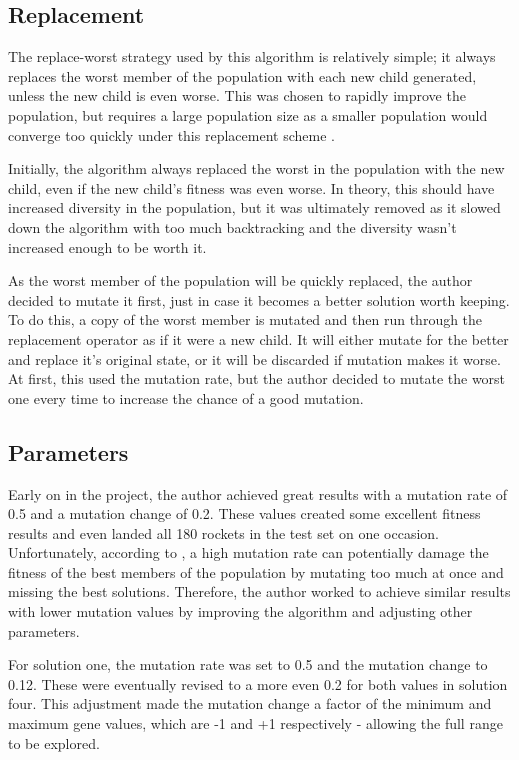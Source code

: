 \documentclass[sigconf]{acmart}
\begin{document}
\subsection{Replacement}
The replace-worst strategy used by this algorithm is relatively simple; it always replaces the worst member of the population with each new child generated, unless the new child is even worse. This was chosen to rapidly improve the population, but requires a large population size as a smaller population would converge too quickly under this replacement scheme \cite{replacement}.

Initially, the algorithm always replaced the worst in the population with the new child, even if the new child's fitness was even worse. In theory, this should have increased diversity in the population, but it was ultimately removed as it slowed down the algorithm with too much backtracking and the diversity wasn't increased enough to be worth it.

As the worst member of the population will be quickly replaced, the author decided to mutate it first, just in case it becomes a better solution worth keeping. To do this, a copy of the worst member is mutated and then run through the replacement operator as if it were a new child. It will either mutate for the better and replace it's original state, or it will be discarded if mutation makes it worse. At first, this used the mutation rate, but the author decided to mutate the worst one every time to increase the chance of a good mutation.

\subsection{Parameters}
Early on in the project, the author achieved great results with a mutation rate of 0.5 and a mutation change of 0.2. These values created some excellent fitness results and even landed all 180 rockets in the test set on one occasion. Unfortunately, according to \cite{mutateRate}, a high mutation rate can potentially damage the fitness of the best members of the population by mutating too much at once and missing the best solutions. Therefore, the author worked to achieve similar results with lower mutation values by improving the algorithm and adjusting other parameters. 

For solution one, the mutation rate was set to 0.5 and the mutation change to 0.12. These were eventually revised to a more even 0.2 for both values in solution four. This adjustment made the mutation change a factor of the minimum and maximum gene values, which are -1 and +1 respectively - allowing the full range to be explored.
\end{document}
